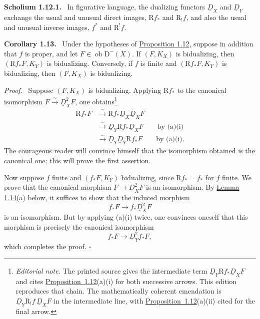 \documentclass[11pt]{article}
\providecommand{\qedtext}{\hfill$\square$}
\newenvironment{statement}[1]{\par\medskip\noindent\textbf{#1.}\ }{\par\medskip}
\newenvironment{prooftext}[1][Proof]{\par\noindent\emph{#1.}\ }{\par\medskip}
\newcommand{\R}{\mathrm{R}}
\newcommand{\D}{\mathrm{D}}
\newcommand{\ob}{\operatorname{ob}}
\providecommand{\ob}{\operatorname{ob}}
\providecommand{\R}{\mathrm R}
\providecommand{\qedtext}{\hfill$\square$}
\begin{document}
\label{sga5:I:scholium:1.12.1}\begin{statement}{Scholium 1.12.1}
In figurative language, the dualizing functors $\underline D_X$ and $\underline D_Y$ exchange the usual and unusual direct images, $\R f_*$ and $\R_!f$, and also the usual and unusual inverse images, $f^*$ and $\R^!f$.
\end{statement}

\label{sga5:I:corollary:1.13}\begin{statement}{Corollary 1.13}
Under the hypotheses of \hyperref[sga5:I:proposition:1.12]{Proposition 1.12}, suppose in addition that $f$ is proper, and let $F\in\ob\D^-(X)$. If $(F,K_X)$ is bidualizing, then $(\R f_*F,K_Y)$ is bidualizing. Conversely, if $f$ is finite and $(\R f_*F,K_Y)$ is bidualizing, then $(F,K_X)$ is bidualizing.
\end{statement}

\begin{prooftext}
Suppose $(F,K_X)$ is bidualizing. Applying $\R f_*$ to the canonical isomorphism $F\xrightarrow{\sim}\underline D_X^2F$, one obtains\footnote{\emph{Editorial note.} The printed source gives the intermediate term $\underline D_Y\R f_*\underline D_XF$ and cites \hyperref[sga5:I:proposition:1.12]{Proposition~1.12}(a)(i) for both successive arrows. This edition reproduces that chain. The mathematically coherent emendation is $\underline D_Y\R_!f\,\underline D_XF$ in the intermediate line, with \hyperref[sga5:I:proposition:1.12]{Proposition~1.12}(a)(ii) cited for the final arrow.}
\begin{align*}
\R f_*F &\xrightarrow{\sim}\R f_*\underline D_X\underline D_XF \\
&\xrightarrow{\sim}\underline D_Y\R f_*\underline D_XF \qquad \text{by (a)(i)}\\
&\xrightarrow{\sim}\underline D_Y\underline D_Y\R f_*F \qquad \text{by (a)(i)}.
\end{align*}
The courageous reader will convince himself that the isomorphism obtained is the canonical one; this will prove the first assertion.

Now suppose $f$ finite and $(f_*F,K_Y)$ bidualizing, since $\R f_*=f_*$ for $f$ finite. We prove that the canonical morphism $F\to\underline D_X^2F$ is an isomorphism. By \hyperref[sga5:I:lemma:1.14]{Lemma 1.14}(a) below, it suffices to show that the induced morphism
\[
   f_*F\longrightarrow f_*\underline D_X^2F
\]
is an isomorphism. But by applying (a)(i) twice, one convinces oneself that this morphism is precisely the canonical isomorphism
\[
   f_*F\longrightarrow \underline D_Y^2f_*F,
\]
which completes the proof. \qedtext
\end{prooftext}
\end{document}
